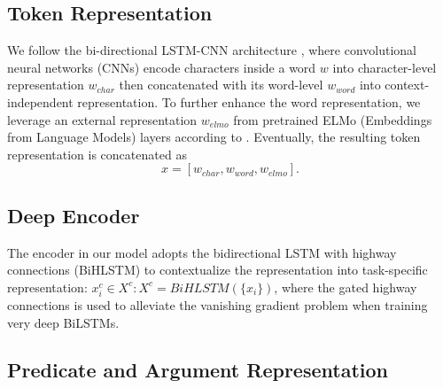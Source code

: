 \documentclass[letterpaper]{article} %
\begin{document}
\subsection{Token Representation}
We follow the bi-directional LSTM-CNN architecture \cite{chiu2016named}, where convolutional neural networks (CNNs) encode characters inside a word $w$ into character-level representation $w_{char}$ then concatenated with its word-level $w_{word}$ into context-independent representation. To further enhance the word representation, we leverage an external representation $w_{elmo}$ from pretrained ELMo (Embeddings from Language Models) layers according to \citeauthor{ELMo} . 
Eventually, the resulting token representation is concatenated as 
\begin{equation}
x = [w_{char} , w_{word} , w_{elmo}].\nonumber
\end{equation}



\subsection{Deep Encoder}

The encoder in our model adopts the bidirectional LSTM with highway connections (BiHLSTM) %
to contextualize the representation into task-specific representation: 
$x^c_i \in X^c: X^c = \textit{BiHLSTM}(\{x_i\}) $,
where the gated highway connections is used to alleviate the vanishing gradient problem when training very deep BiLSTMs.%


\subsection{Predicate and Argument Representation}
\end{document}
